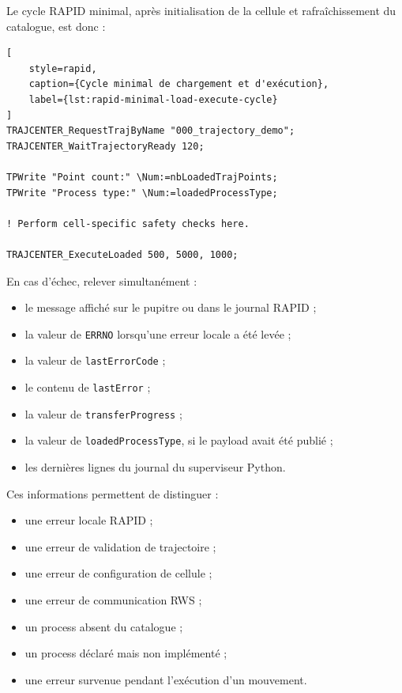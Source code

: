 \documentclass{rapportENSAM}
\begin{document}
Le cycle RAPID minimal, après initialisation de la cellule et rafraîchissement
du catalogue, est donc :

\begin{lstlisting}[
    style=rapid,
    caption={Cycle minimal de chargement et d'exécution},
    label={lst:rapid-minimal-load-execute-cycle}
]
TRAJCENTER_RequestTrajByName "000_trajectory_demo";
TRAJCENTER_WaitTrajectoryReady 120;

TPWrite "Point count:" \Num:=nbLoadedTrajPoints;
TPWrite "Process type:" \Num:=loadedProcessType;

! Perform cell-specific safety checks here.

TRAJCENTER_ExecuteLoaded 500, 5000, 1000;
\end{lstlisting}

En cas d'échec, relever simultanément :

\begin{itemize}
    \item le message affiché sur le pupitre ou dans le journal RAPID ;
    \item la valeur de \texttt{ERRNO} lorsqu'une erreur locale a été levée ;
    \item la valeur de \texttt{lastErrorCode} ;
    \item le contenu de \texttt{lastError} ;
    \item la valeur de \texttt{transferProgress} ;
    \item la valeur de \texttt{loadedProcessType}, si le payload avait été
    publié ;
    \item les dernières lignes du journal du superviseur Python.
\end{itemize}

Ces informations permettent de distinguer :

\begin{itemize}
    \item une erreur locale RAPID ;
    \item une erreur de validation de trajectoire ;
    \item une erreur de configuration de cellule ;
    \item une erreur de communication RWS ;
    \item un process absent du catalogue ;
    \item un process déclaré mais non implémenté ;
    \item une erreur survenue pendant l'exécution d'un mouvement.
\end{itemize}
\end{document}
